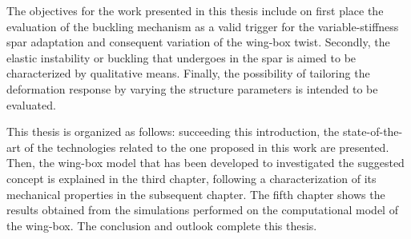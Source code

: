 The objectives for the work presented in this thesis include on first place the evaluation of the buckling mechanism as a valid trigger for the variable-stiffness spar adaptation and consequent variation of the wing-box twist. Secondly, the elastic instability or buckling that undergoes in the spar is aimed to be characterized by qualitative means. Finally, the possibility of tailoring the deformation response by varying the structure parameters is intended to be evaluated. 

This thesis is organized as follows: succeeding this introduction, the state-of-the-art of the technologies related to the one proposed in this work are presented. Then, the wing-box model that has been developed to investigated the suggested concept is explained in the third chapter, following a characterization of its mechanical properties in the subsequent chapter. The fifth chapter shows the results obtained from the simulations performed on the computational model of the wing-box. The conclusion and outlook complete this thesis.